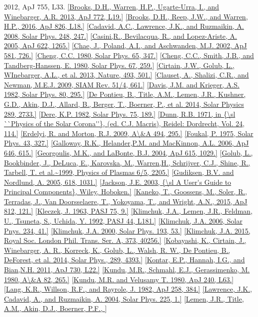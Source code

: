 \documentclass[10pt,preprint]{aastex}  %
\begin{document}
\begin{references}
{	2012, ApJ 755, L33.}
\ref{Brooks, D.H., Warren, H.P., Ugarte-Urra, I., and Winebarger, A.R.
 	2013, ApJ 772, L19.}
\ref{Brooks, D.H., Reep, J.W., and Warren, H.P., 
 	2016, ApJ 826, L18.}
\ref{Cadavid, A.C., Lawrence, J.K., and Ruzmaikin, A. 
	2008, Solar Phys. 248, 247.}
\ref{Casini,R., Bevilacqua, R., and Lopez-Ariste, A. 2005, ApJ 622, 1265.}
\ref{Chae, J., Poland, A.I., and Aschwanden, M.J. 2002, ApJ 581, 726.}
\ref{Cheng, C.C. 1980, Solar Phys. 65, 347.}
\ref{Cheng, C.C., Smith, J.B., and Tandberg-Hanssen, E. 
	1980, Solar Phys. 67, 259.}
\ref{Cirtain, J.W., Golub, L., WInebarger, A.L., et al.
	2013, Nature, 493, 501.}
\ref{Clauset, A., Shalizi, C.R., and Newman, M.E.J. 2009, SIAM Rev. 51/4, 661.}
\ref{Davis, J.M. and Krieger, A.S. 1982, Solar Phys. 80, 295.}
\ref{De Pontieu, B., Title, A.M., Lemen, J.R., Kushner, G.D.,
        Akin, D.J., Allard, B., Berger, T., Boerner, P., et al.
        2014, Solar Physics 289, 2733.}
\ref{Dere, K.P. 1982, Solar Phys. 75, 189.}
\ref{Dunn, R.B. 1971, in {\sl ``Physics of the Solar Corona''},
	(ed. C.J. Macris), Reidel: Dordrecht, Vol. 24, 114.}
\ref{Erdelyi, R. and Morton, R.J. 2009, A\&A 494, 295.}
\ref{Foukal, P. 1975, Solar Phys. 43, 327.}
\ref{Galloway, R.K., Helander,P.M. and MacKinnon, A.L. 2006, ApJ 646, 615.}
\ref{Georgoulis, M.K., and LaBonte, B.J. 2004, ApJ 615, 1029.}
\ref{Golub, L., Bookbinder, J., DeLuca, E., Karovska, M., Warren,H.,
	Schrijver, C.J., Shine, R., Tarbell, T. et al.~1999,
	Physics of Plasmas 6/5, 2205.}
\ref{Gudiksen, B.V. and Nordlund, A. 2005, 618, 1031.} 
\ref{Jackson, J.E. 2003, {\sl A User's Guide to Principal Components},
	Wiley, Hoboken.}
\ref{Kaneko, T., Goossens, M., Soler, R., Terradas, J., Van Doorsselaere, T., 
	Yokoyama, T., and Wright, A.N., 2015, ApJ 812, 121.}
\ref{Kleczek, J. 1963, PASJ 75, 9.}
\ref{Klimchuk, J.A., Lemen, J.R., Feldman, U., Tsuneta, S., Uchida, Y.
	1992, PASJ 44, L181.}
\ref{Klimchuk, J.A. 2006, Solar Pnys. 234, 41.}
\ref{Klimchuk, J.A. 2000, Solar Phys. 193, 53.}
\ref{Klimchuk, J.A. 2015, Royal Soc. London Phil. Trans. Ser. A, 373, 40256.}
\ref{Kobayashi, K., Cirtain, J., Winebarger, A. R., Korreck, K., 
 	Golub, L., Walsh, R. W., De Pontieu, B., DeForest, et al.
 	2014, Solar Phys., 289, 4393.}
\ref{Kontar, E.P., Hannah, I.G., and Bian,N.H. 2011, ApJ 730, L22.}
\ref{Kundu, M.R., Schmahl, E.J., Gerassimenko, M. 1980, A\&A 82, 265.}
\ref{Kundu, M.R. and Velusamy T. 1980, ApJ 240, L63.}
\ref{Lang, K.R., Willson, R.F., and Rayrole, J. 1982, ApJ 258, 384.}
\ref{Lawrence, J.K., Cadavid, A., and Ruzmaikin, A. 2004, Solar Phys. 225, 1.}
\ref{Lemen, J.R., Title, A.M., Akin, D.J., Boerner, P.F.,
}
\end{references}
\end{document}
